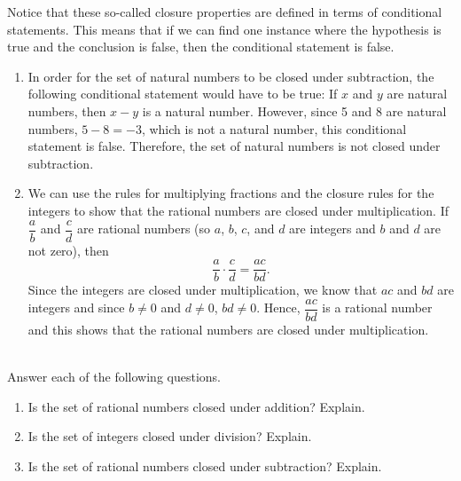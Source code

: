 Notice that these so-called closure properties are defined in terms of conditional statements.  This means that if we can find one instance where the hypothesis is true and the conclusion is false, then the conditional statement is false.

\begin{example}\label{ex:closure} \hfill 
\begin{enumerate}
\item In order for the set of natural numbers to be closed under subtraction, the following conditional statement would have to be true:  If $x$ and $y$ are natural numbers, then $x - y$ is a natural number.  However, since 5 and 8 are natural numbers,  $5 - 8 = -3$, which is not a natural number, this conditional statement is false.  Therefore, the set of natural numbers is not closed under subtraction.


\item We can use the rules for multiplying fractions and the closure rules for the integers to show that the rational numbers are closed under multiplication.  If $\dfrac{a}{b}$ and $\dfrac{c}{d}$ are rational numbers (so $a$, $b$, $c$, and $d$ are integers and $b$ and $d$ are not zero), then
\[
\frac{a}{b} \cdot \frac{c}{d} = \frac{ac}{bd}.
\]
Since the integers are closed under multiplication, we know that $ac$ and $bd$ are integers and since $b \ne 0$ and $d \ne 0$, $bd \ne 0$.  Hence, $\dfrac{ac}{bd}$ is a rational number and this shows that the rational numbers are closed under multiplication.
\end{enumerate}
\end{example}
\hbreak

\begin{prog}\label{pr:closure} \hfill \\
Answer each of the following questions.
\begin{enumerate}
\item Is the set of rational numbers closed under addition?  Explain.

\item Is the set of integers closed under division?  Explain.

\item Is the set of rational numbers closed under subtraction?  Explain.


\end{enumerate}
\end{prog}
%
\hbreak
\newpage

\endinput
